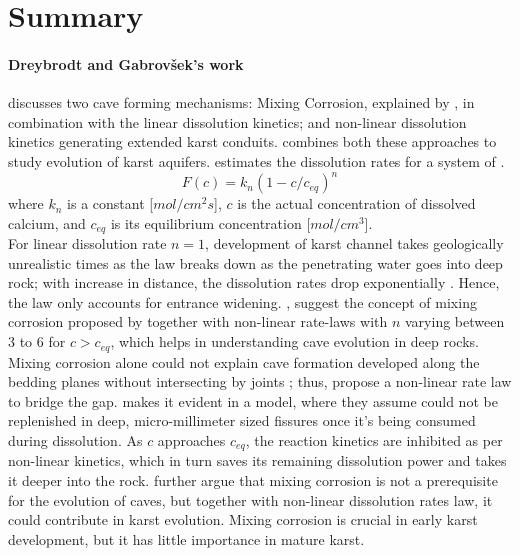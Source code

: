 \section{Summary}\label{sec:summary}
\paragraph*{Dreybrodt and Gabrov{\v{s}}ek's work} \citet{gabrovvsek2000role} discusses two cave forming mechanisms: Mixing Corrosion, explained by \citet{bogli1980physical}, in combination with the linear dissolution kinetics; and non-linear dissolution kinetics generating extended karst conduits. \citet{gabrovvsek2000role} combines both these approaches to study evolution of karst aquifers. \citet{Dreybrodt1996} estimates the dissolution rates for a system of .
\[
F(c) = k_n(1-c/c_{eq})^n
\]
where $k_n$ is a constant [$mol/cm^2s$], $c$ is the actual concentration of dissolved calcium, and $c_{eq}$ is its equilibrium concentration [$mol/cm^3$].\\
For linear dissolution rate $n = 1$, development of karst channel takes geologically unrealistic times as the law breaks down as the penetrating water goes into deep rock; with increase in distance, the dissolution rates drop exponentially \cite{Dreybrodt1996}. Hence, the law only accounts for entrance widening. \citet{dreybrodt2004dissolution}, \citet{gabrovvsek2000role} suggest the concept of mixing corrosion proposed by \citet{bogli1980physical} together with non-linear rate-laws with $n$ varying between 3 to 6 for $c > c_{eq}$, which helps in understanding cave evolution in deep rocks. Mixing corrosion alone could not explain cave formation developed along the bedding planes without intersecting by joints \cite{ford1978development}; thus, \citet{gabrovvsek2000role} propose a non-linear rate law to bridge the gap. \citet{gabrovvsek2000role} makes it evident in a model, where they assume  could not be replenished in deep, micro-millimeter sized fissures once it's being consumed during dissolution. As $c$ approaches $c_{eq}$, the reaction kinetics are inhibited as per non-linear kinetics, which in turn saves its remaining dissolution power and takes it deeper into the rock. \citet{gabrovvsek2000role} further argue that mixing corrosion is not a prerequisite for the evolution of caves, but together with non-linear dissolution rates law, it could contribute in karst evolution. Mixing corrosion \cite{bogli1980physical} is crucial in early karst development, but it has little importance in mature karst. \\



